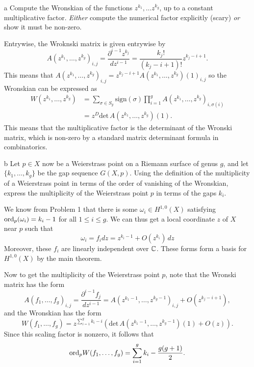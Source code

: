 \documentclass[expanded]{lkx_pset}
\begin{document}
\begin{parts}
	\begin{part}{a}
		Compute the Wronskian of the functions $z^{k_{1}}, \dots
			z^{k_{g}}$, up to a constant multiplicative factor. \emph{Either}
		compute the numerical factor explicitly (scary) \emph{or} show it
		must be non-zero.
	\end{part}

	Entrywise, the Wroknski matrix is given entrywise by
	\[
		A(z^{k_1},\ldots, z^{k_g})_{i,j} = \frac{\partial^{i-1}z^{k_j}}{dz^{i-1}}=\frac{k_j!}{(k_j-i+1)!}z^{k_j-i+1}.
	\]
	This means that $A(z^{k_1},\ldots, z^{k_g})_{i,j} = z^{k_j - i +1} A(z^{k_1},\ldots, z^{k_g})(1)_{i,j}$ so the Wronskian can be expressed as
	\[
		\begin{aligned}
			W(z^{k_1},\ldots, z^{k_g}) &
			= \sum_{\sigma \in S_g}\textrm{sign}(\sigma)\prod^g_{i=1} A(z^{k_1},\ldots, z^{k_g})_{i, \sigma(i)} \\
			                           & = z^{D} \textrm{det}\,A(z^{k_1},\ldots, z^{k_g})(1).
		\end{aligned}
	\]
	This means that the multiplicative factor is the determinant of the Wronski matrix, which is non-zero by a standard matrix determinant formula in combinatorics.

	\begin{part}{b}
		Let $p\in X$ now be a Weierstrass point on a Riemann surface of
		genus $g$, and let $\{k_{1}, \dots, k_{g}\}$ be the gap sequence
		$G(X,p)$. Using the definition of the multiplicity of a
		Weierstrass point in terms of the order of vanishing of the
		Wronskian, express the multiplicity of the Weierstrass point $p$
		in terms of the gaps $k_{i}$.
	\end{part}

	We know from Problem 1 that there is some $\omega_i\in H^{1,0}(X)$ satisfying $\mathrm{ord}_p(\omega_i)=k_i-1$ for all $1\leq i\leq g$. We can thus get a local coordinate $z$ of $X$ near $p$ such that
	\[\omega_i = f_i dz = z^{k_i-1} + O(z^{k_i})\, dz\]
	Moreover, these $f_i$ are linearly independent over $\mathbb{C}$. These forms form a basis for $H^{1,0}(X)$ by the main theorem.

	Now to get the multiplicity of the Weierstrass point $p$, note that the Wronski matrix has the form
	\[
		A(f_1,\ldots, f_g)_{i,j} = \frac{\partial^{i-1} f_j}{dz^{i-1}} = A(z^{k_1-1},\ldots, z^{k_g-1})_{i,j} + O(z^{k_j-i+1}),
	\]
	and the Wronskian has the form
	\[
		W(f_1,\ldots, f_g) = z^{\sum_{i=1}^g k_i-i}\left(\textrm{det}\, A(z^{k_1-1}, \ldots, z^{k_g-1})(1) + O(z)\right).
	\]
	Since this scaling factor is nonzero, it follows that
	\[
		\mathrm{ord}_p W(f_1,\ldots, f_g) = \sum^g_{i=1}k_i - \frac{g(g+1)}{2}.
	\]


\end{parts}
\end{document}
